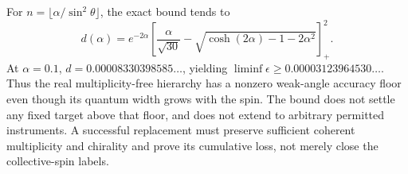 For $n=\lfloor\alpha/\sin^2\theta\rfloor$, the exact bound tends to
\[
 d(\alpha)=e^{-2\alpha}\left[
 \frac\alpha{\sqrt{30}}-
 \sqrt{\cosh(2\alpha)-1-2\alpha^2}\right]_+^2.
\]
At $\alpha=0.1$, $d=0.00008330398585\ldots$, yielding
$\liminf\epsilon\ge0.00003123964530\ldots$.
Thus the real multiplicity-free hierarchy has a nonzero weak-angle
accuracy floor even though its quantum width grows with the spin. The
bound does not settle any fixed target above that floor, and does not
extend to arbitrary permitted instruments. A successful replacement must
preserve sufficient coherent multiplicity and chirality and prove its
cumulative loss, not merely close the collective-spin labels.
